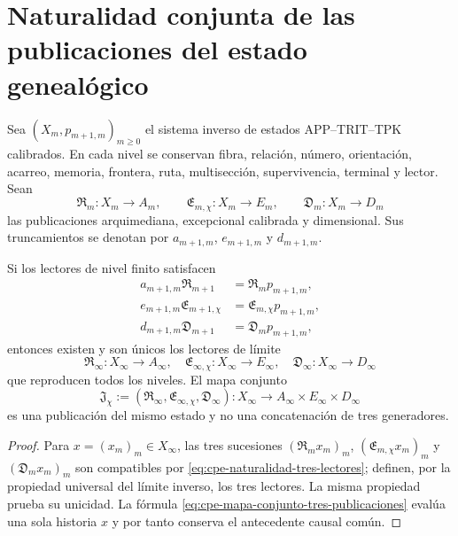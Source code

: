 \section{Naturalidad conjunta de las publicaciones del estado genealógico}
\label{sec:cpe-naturalidad-tres-publicaciones}

Sea \((X_m,p_{m+1,m})_{m\ge0}\) el sistema inverso de estados
APP--TRIT--TPK calibrados. En cada nivel se conservan fibra, relación,
número, orientación, acarreo, memoria, frontera, ruta, multisección,
supervivencia, terminal y lector. Sean
\[
 \mathfrak R_m:X_m\to A_m,
 \qquad
 \mathfrak E_{m,\chi}:X_m\to E_m,
 \qquad
 \mathfrak D_m:X_m\to D_m
\]
las publicaciones arquimediana, excepcional calibrada y dimensional. Sus
truncamientos se denotan por \(a_{m+1,m}\), \(e_{m+1,m}\) y
\(d_{m+1,m}\).

\begin{theorem}
\label{thm:cpe-cono-tres-publicaciones}
Si los lectores de nivel finito satisfacen
\begin{equation}
\begin{aligned}
 a_{m+1,m}\mathfrak R_{m+1}&=\mathfrak R_mp_{m+1,m},\\
 e_{m+1,m}\mathfrak E_{m+1,\chi}&=\mathfrak E_{m,\chi}p_{m+1,m},\\
 d_{m+1,m}\mathfrak D_{m+1}&=\mathfrak D_mp_{m+1,m},
\end{aligned}
\label{eq:cpe-naturalidad-tres-lectores}
\end{equation}
entonces existen y son únicos los lectores de límite
\[
 \mathfrak R_\infty:X_\infty\to A_\infty,
 \quad
 \mathfrak E_{\infty,\chi}:X_\infty\to E_\infty,
 \quad
 \mathfrak D_\infty:X_\infty\to D_\infty
\]
que reproducen todos los niveles. El mapa conjunto
\begin{equation}
 \mathfrak J_\chi
 :=(\mathfrak R_\infty,\mathfrak E_{\infty,\chi},\mathfrak D_\infty)
 :X_\infty\longrightarrow A_\infty\times E_\infty\times D_\infty
 \label{eq:cpe-mapa-conjunto-tres-publicaciones}
\end{equation}
es una publicación del mismo estado y no una concatenación de tres
generadores.
\end{theorem}

\begin{proof}
Para \(x=(x_m)_m\in X_\infty\), las tres sucesiones
\((\mathfrak R_mx_m)_m\), \((\mathfrak E_{m,\chi}x_m)_m\) y
\((\mathfrak D_mx_m)_m\) son compatibles por
\eqref{eq:cpe-naturalidad-tres-lectores}; definen, por la propiedad universal
del límite inverso, los tres lectores. La misma propiedad prueba su unicidad.
La fórmula \eqref{eq:cpe-mapa-conjunto-tres-publicaciones} evalúa una sola
historia \(x\) y por tanto conserva el antecedente causal común.
\end{proof}

